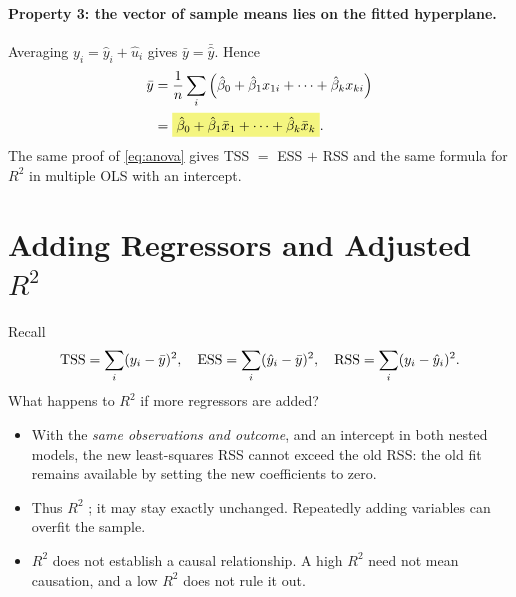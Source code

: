 \paragraph{Property 3: the vector of sample means lies on the fitted hyperplane.}
Averaging $y_i=\hat y_i+\hat u_i$ gives $\bar y=\bar{\hat y}$. Hence
\begin{align*}
\bar y
&=\frac1n\sum_i\left(\hat\beta_0+\hat\beta_1x_{1i}+\cdots+\hat\beta_kx_{ki}\right)\\
&=\hm{\hat\beta_0+\hat\beta_1\bar x_1+\cdots+\hat\beta_k\bar x_k}.
\end{align*}
The same proof of \eqref{eq:anova} gives TSS $=$ ESS $+$ RSS and the same formula for $R^2$ in multiple OLS with an intercept.

\section[Adding Regressors and Adjusted R-squared]{Adding Regressors and Adjusted $R^2$}
\label{sec:adjusted-r2}
Recall
\[\operatorname{TSS}=\sum_i(y_i-\bar y)^2,\quad
\operatorname{ESS}=\sum_i(\hat y_i-\bar y)^2,\quad
\operatorname{RSS}=\sum_i(y_i-\hat y_i)^2.\]
What happens to $R^2$ if more regressors are added?
\begin{itemize}
\item With the \emph{same observations and outcome}, and an intercept in both nested models, the new least-squares RSS cannot exceed the old RSS: the old fit remains available by setting the new coefficients to zero.
\item Thus $R^2$ ; it may stay exactly unchanged. Repeatedly adding variables can overfit the sample.
\item $R^2$ does not establish a causal relationship. A high $R^2$ need not mean causation, and a low $R^2$ does not rule it out.
\end{itemize}

